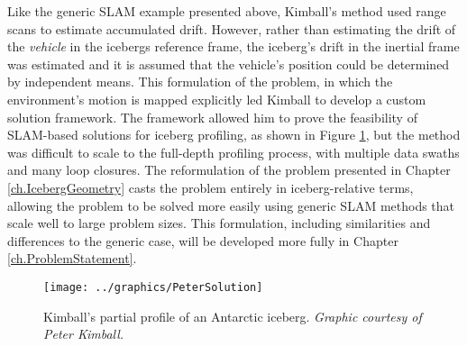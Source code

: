 Like the generic SLAM example presented above, Kimball's method used range scans to estimate accumulated drift. However, rather than estimating the drift of the \emph{vehicle} in the icebergs reference frame, the iceberg's drift in the inertial frame was estimated and it is assumed that the vehicle's position could be determined by independent means. This formulation of the problem, in which the environment's motion is mapped explicitly led Kimball to develop a custom solution framework. The framework allowed him to prove the feasibility of SLAM-based solutions for iceberg profiling, as shown in Figure \ref{fig:KimballSolution}, but the method was difficult to scale to the full-depth profiling process, with multiple data swaths and many loop closures. The reformulation of the problem presented in Chapter \ref{ch.IcebergGeometry} casts the problem entirely in iceberg-relative terms, allowing the problem to be solved more easily using generic SLAM methods that scale well to large problem sizes. This formulation, including similarities and differences to the generic case, will be developed more fully in Chapter \ref{ch.ProblemStatement}.

 \begin{figure}[!htb]
   \centering
   \texttt{[image: ../graphics/PeterSolution]} %
   \caption{Kimball's partial profile of an Antarctic iceberg. \emph{Graphic courtesy of Peter Kimball.}}
   \label{fig:KimballSolution}
\end{figure}


